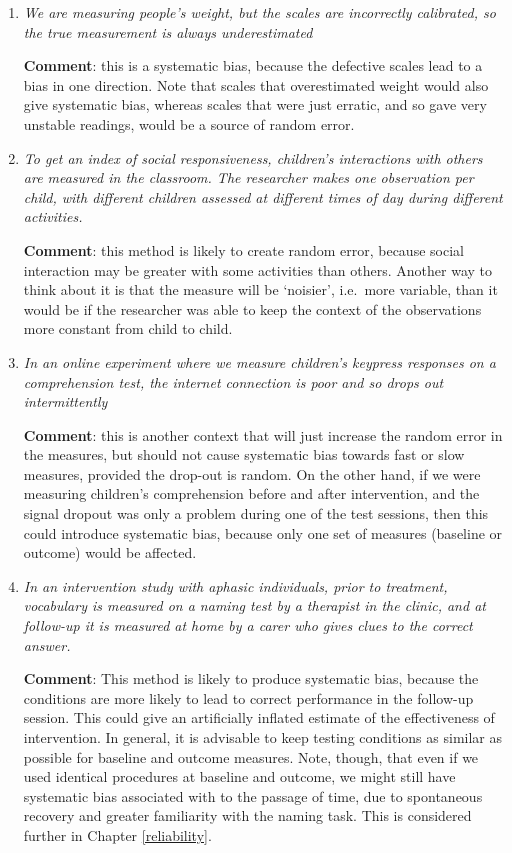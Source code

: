 \documentclass{krantz}
\begin{document}
\begin{enumerate}
\def\labelenumi{\arabic{enumi}.}
\item
  \emph{We are measuring people's weight, but the scales are incorrectly calibrated, so the true measurement is always underestimated}

  \textbf{Comment}: this is a systematic bias, because the defective scales lead to a bias in one direction. Note that scales that overestimated weight would also give systematic bias, whereas scales that were just erratic, and so gave very unstable readings, would be a source of random error.
\item
  \emph{To get an index of social responsiveness, children's interactions with others are measured in the classroom. The researcher makes one observation per child, with different children assessed at different times of day during different activities.}

  \textbf{Comment}: this method is likely to create random error, because social interaction may be greater with some activities than others. Another way to think about it is that the measure will be `noisier', i.e.~more variable, than it would be if the researcher was able to keep the context of the observations more constant from child to child.
\item
  \emph{In an online experiment where we measure children's keypress responses on a comprehension test, the internet connection is poor and so drops out intermittently}

  \textbf{Comment}: this is another context that will just increase the random error in the measures, but should not cause systematic bias towards fast or slow measures, provided the drop-out is random. On the other hand, if we were measuring children's comprehension before and after intervention, and the signal dropout was only a problem during one of the test sessions, then this could introduce systematic bias, because only one set of measures (baseline or outcome) would be affected.
\item
  \emph{In an intervention study with aphasic individuals, prior to treatment, vocabulary is measured on a naming test by a therapist in the clinic, and at follow-up it is measured at home by a carer who gives clues to the correct answer.}

  \textbf{Comment}: This method is likely to produce systematic bias, because the conditions are more likely to lead to correct performance in the follow-up session. This could give an artificially inflated estimate of the effectiveness of intervention. In general, it is advisable to keep testing conditions as similar as possible for baseline and outcome measures. Note, though, that even if we used identical procedures at baseline and outcome, we might still have systematic bias associated with to the passage of time, due to spontaneous recovery and greater familiarity with the naming task. This is considered further in Chapter \ref{reliability}.
\end{enumerate}
\end{document}
